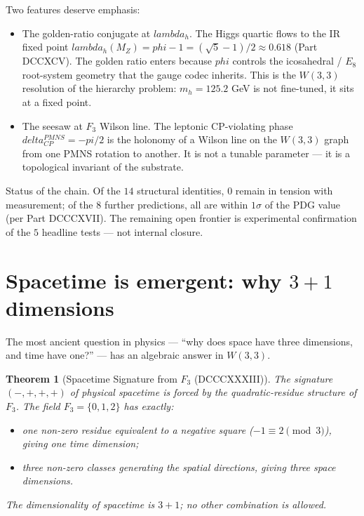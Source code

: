 \documentclass[11pt]{article}
\def\mathbb#1{#1}%
\def\textbf#1{#1}%
\def\delta{delta}%
\def\lambda{lambda}%
\def\phi{phi}%
\def\pi{pi}%
\newtheorem*{theorem}{Theorem}
\begin{document}
Two features deserve emphasis:

\begin{itemize}[leftmargin=2em]
\item \textbf{The golden-ratio conjugate at $\lambda_h$.} The Higgs quartic flows to the IR fixed point $\lambda_h(M_Z) = \phi - 1 = (\sqrt{5}-1)/2 \approx 0.618$ (Part DCCXCV). The golden ratio enters because $\phi$ controls the icosahedral / $E_8$ root-system geometry that the gauge codec inherits. This is the $W(3,3)$ resolution of the hierarchy problem: $m_h = 125.2$ GeV is not fine-tuned, it sits at a fixed point.

\item \textbf{The seesaw at $\mathbb{F}_3$ Wilson line.} The leptonic CP-violating phase $\delta_{CP}^{PMNS} = -\pi/2$ is the holonomy of a Wilson line on the $W(3,3)$ graph from one PMNS rotation to another. It is not a tunable parameter --- it is a topological invariant of the substrate.
\end{itemize}

\textbf{Status of the chain.} Of the $14$ structural identities, $0$ remain in tension with measurement; of the $8$ further predictions, all are within $1\sigma$ of the PDG value (per Part DCCCXVII). The remaining open frontier is experimental confirmation of the $5$ headline tests --- not internal closure.

\section{\texorpdfstring{Spacetime is emergent: why $3+1$ dimensions}{Spacetime is emergent: why 3+1 dimensions}}

\label{sec:spacetime-emergence}

The most ancient question in physics --- ``why does space have three dimensions, and time have one?'' --- has an algebraic answer in $W(3,3)$.

\begin{theorem}[Spacetime Signature from $\mathbb{F}_3$ (DCCCXXXIII)]
The signature $(-,+,+,+)$ of physical spacetime is forced by the quadratic-residue structure of $\mathbb{F}_3$. The field $\mathbb{F}_3 = \{0,1,2\}$ has exactly:
\begin{itemize}[leftmargin=2em]
\item one non-zero residue equivalent to a negative square ($-1 \equiv 2 \pmod 3$), giving \textbf{one time dimension};
\item three non-zero classes generating the spatial directions, giving \textbf{three space dimensions}.
\end{itemize}
The dimensionality of spacetime is $3+1$; no other combination is allowed.
\end{theorem}
\end{document}
